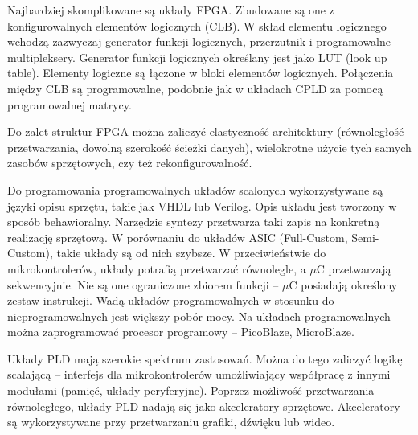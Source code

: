 Najbardziej skomplikowane są układy FPGA. Zbudowane są one z konfigurowalnych elementów logicznych (CLB). W skład elementu logicznego wchodzą zazwyczaj generator funkcji logicznych, przerzutnik i programowalne multipleksery. Generator funkcji logicznych określany jest jako LUT (look up table). Elementy logiczne są łączone w bloki elementów logicznych. Połączenia między CLB są programowalne, podobnie jak w układach CPLD za pomocą programowalnej matrycy.

Do zalet struktur FPGA można zaliczyć elastyczność architektury (równoległość przetwarzania, dowolną szerokość ścieżki danych), wielokrotne użycie tych samych zasobów sprzętowych, czy też rekonfigurowalność.

Do programowania programowalnych układów scalonych wykorzystywane są języki opisu sprzętu, takie jak VHDL lub Verilog. Opis układu jest tworzony w sposób behawioralny. Narzędzie syntezy przetwarza taki zapis na konkretną realizację sprzętową. W porównaniu do układów ASIC (Full-Custom, Semi-Custom), takie układy są od nich szybsze. W przeciwieństwie do mikrokontrolerów, układy potrafią przetwarzać równolegle, a $\mu$C przetwarzają sekwencyjnie. Nie są one ograniczone zbiorem funkcji -- $\mu$C posiadają określony zestaw instrukcji. Wadą układów programowalnych w stosunku do nieprogramowalnych jest większy pobór mocy. Na układach programowalnych można zaprogramować procesor programowy -- PicoBlaze, MicroBlaze.

Układy PLD mają szerokie spektrum zastosowań. Można do tego zaliczyć logikę scalającą -- interfejs dla mikrokontrolerów umożliwiający współpracę z innymi modułami (pamięć, układy peryferyjne). Poprzez możliwość przetwarzania równoległego, układy PLD nadają się jako akceleratory sprzętowe. Akceleratory są wykorzystywane przy przetwarzaniu grafiki, dźwięku lub wideo.